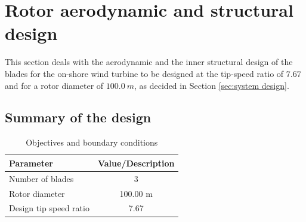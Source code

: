 \section{Rotor aerodynamic and structural design} \label{sec:rotor design}
This section deals with the aerodynamic and the inner structural design of the blades for the on-shore wind turbine to be designed at the tip-speed ratio of $7.67$ and for a rotor diameter of $100.0\ m$, as decided in Section \ref{sec:system design}.

\subsection{Summary of the design}

\begin{table}[H]
\begin{center} 
\caption{Objectives and boundary conditions}\label{tab:rotordesign1}
\begin{tabular}{ |l|c| } 
\hline
\textbf{Parameter} & \textbf{Value/Description}  \\ 
\hline
Number of blades & 3  \\ 
\hline
Rotor diameter & 100.00 m \\ 
\hline
Design tip speed ratio & 7.67 \\
\hline
\end{tabular} \\
\end{center}
\end{table}

